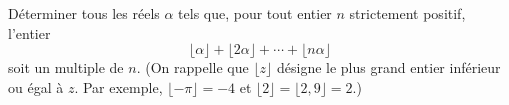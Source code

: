 Déterminer tous les réels $\alpha$ tels que, pour tout entier $n$ strictement positif, l'entier
\[
\lfloor \alpha \rfloor + \lfloor 2\alpha \rfloor + \cdots + \lfloor n\alpha \rfloor
\]
soit un multiple de $n$. (On rappelle que $\lfloor z \rfloor$ désigne le plus grand entier inférieur ou égal
à $z$. Par exemple, $\lfloor -\pi \rfloor = -4$ et $\lfloor 2 \rfloor = \lfloor 2{,}9 \rfloor = 2$.)
